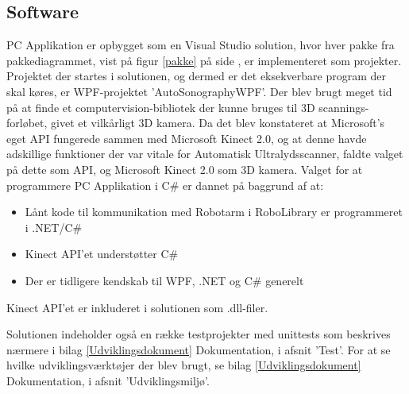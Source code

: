 \subsection{Software}
PC Applikation er opbygget som en Visual Studio solution, hvor hver pakke fra pakkediagrammet, vist på figur \ref{pakke} på side \pageref{pakke}, er implementeret som projekter. Projektet der startes i solutionen, og dermed er det eksekverbare program der skal køres, er WPF-projektet 'AutoSonographyWPF'. \newline
Der blev brugt meget tid på at finde et computervision-bibliotek der kunne bruges til 3D scannings-forløbet, givet et vilkårligt 3D kamera. Da det blev konstateret at Microsoft's eget API fungerede sammen med Microsoft Kinect 2.0, og at denne havde adskillige funktioner der var vitale for Automatisk Ultralydsscanner, faldte valget på dette som API, og Microsoft Kinect 2.0 som 3D kamera. 
Valget for at programmere PC Applikation i C\# er dannet på baggrund af at: 
\begin{itemize}
\item Lånt kode til kommunikation med Robotarm i RoboLibrary er programmeret i .NET/C\#
\item Kinect API'et understøtter C\#
\item Der er tidligere kendskab til WPF, .NET og C\# generelt
\end{itemize}

Kinect API'et er inkluderet i solutionen som .dll-filer.

Solutionen indeholder også en række testprojekter med unittests som beskrives nærmere i bilag \ref{Udviklingsdokument} Dokumentation, i afsnit 'Test'. For at se hvilke udviklingsværktøjer der blev brugt, se bilag \ref{Udviklingsdokument} Dokumentation, i afsnit 'Udviklingsmiljø'. 

